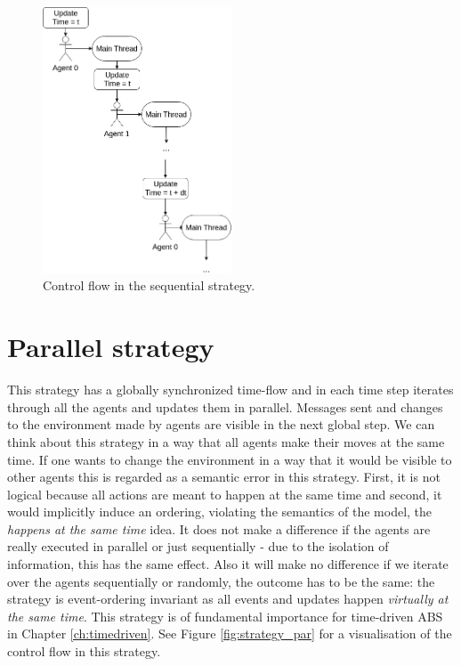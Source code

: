 \begin{figure}[H]
	\centering
	\includegraphics[width=0.5\textwidth, angle=0]{./fig/implabs/sequential.png}
	\caption{Control flow in the sequential strategy.}
	\label{fig:strategy_seq}
\end{figure}

\section{Parallel strategy}
\label{sub:par_strategy}
This strategy has a globally synchronized time-flow and in each time step iterates through all the agents and updates them in parallel. Messages sent and changes to the environment made by agents are visible in the next global step. We can think about this strategy in a way that all agents make their moves at the same time.  If one wants to change the environment in a way that it would be visible to other agents this is regarded as a semantic error in this strategy. First, it is not logical because all actions are meant to happen at the same time and second, it would implicitly induce an ordering, violating the semantics of the model, the \textit{happens at the same time} idea.
It does not make a difference if the agents are really executed in parallel or just sequentially - due to the isolation of information, this has the same effect. Also it will make no difference if we iterate over the agents sequentially or randomly, the outcome has to be the same: the strategy is event-ordering invariant as all events and updates happen \textit{virtually at the same time}. This strategy is of fundamental importance for time-driven ABS in Chapter \ref{ch:timedriven}. See Figure \ref{fig:strategy_par} for a visualisation of the control flow in this strategy.

